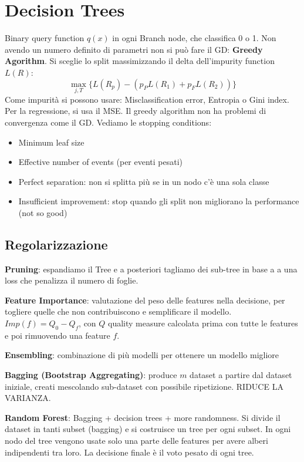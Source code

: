 \documentclass{article}
\begin{document}
\section{Decision Trees}
Binary query function $q(x)$ in ogni Branch node, che classifica 0 o 1.
Non avendo un numero definito di parametri non si può fare il GD: \textbf{Greedy Agorithm}.\newline
Si sceglie lo split massimizzando il delta dell'impurity function $L(R)$:
\[
\max_{j,T}\{L(R_p)-(p_PL(R_1) + p_FL(R_2))\}
\] 
Come impurità si possono usare: Misclassification error, Entropia o Gini index. Per la regressione,
si usa il MSE.\newline
Il greedy algorithm non ha problemi di convergenza come il GD. Vediamo le stopping conditions:
\begin{itemize}
    \item[-] Minimum leaf size
    \item[-] Effective number of events (per eventi pesati)
    \item[-] Perfect separation: non si splitta più se in un nodo c'è una sola classe
    \item[-] Insufficient improvement:  stop quando gli split non migliorano la performance (not so good)
\end{itemize}

\subsection*{Regolarizzazione}
\textbf{Pruning}: espandiamo il Tree e a posteriori tagliamo dei sub-tree in base a
a una loss che penalizza il numero di foglie.\newline

\textbf{Feature Importance}: valutazione del peso delle features nella decisione, per togliere
    quelle che non contribuiscono e semplificare il modello. $Imp(f)=Q_0 - Q_f$, con $Q$ quality measure
    calcolata prima con tutte le features e poi rimuovendo una feature $f$.\newline

\textbf{Ensembling}: combinazione di più modelli per ottenere un modello migliore\newline

\textbf{Bagging (Bootstrap Aggregating)}: produce $m$ dataset a partire dal dataset iniziale,
creati mescolando sub-dataset con possibile ripetizione. RIDUCE LA VARIANZA.

\textbf{Random Forest}: Bagging + decision trees + more randomness.\newline
Si divide il dataset in tanti subset (bagging) e si costruisce un tree per ogni subset. In ogni nodo del tree vengono
usate solo una parte delle features per avere alberi indipendenti tra loro. La decisione finale è il voto
pesato di ogni tree.\newline
\end{document}
